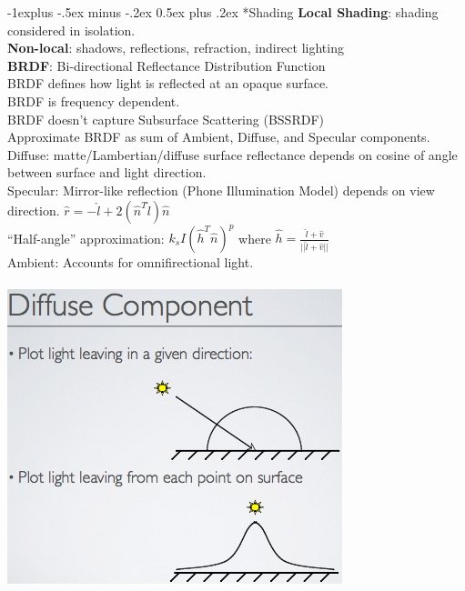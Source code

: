 \documentclass[3pt,landscape]{article}
\makeatletter
\renewcommand{\subsection}{\@startsection{subsection}{2}{0mm}%
                            {-1explus -.5ex minus -.2ex}%
                            {0.5ex plus .2ex}%
                            {\normalfont\normalsize\bfseries}}
\makeatother
\begin{document}
\begin{multicols}{3}
\subsection*{Shading}
{\bf Local Shading}: shading considered in isolation.\\
{\bf Non-local}: shadows, reflections, refraction, indirect lighting\\
{\bf BRDF}: Bi-directional Reflectance Distribution Function\\
BRDF defines how light is reflected at an opaque surface.\\
BRDF is frequency dependent.\\
BRDF doesn't capture Subsurface Scattering (BSSRDF)\\
Approximate BRDF as sum of Ambient, Diffuse, and Specular components.\\
Diffuse: matte/Lambertian/diffuse surface reflectance depends on cosine of angle between surface and light direction.\\
Specular: Mirror-like reflection (Phone Illumination Model) depends on view direction. \(\hat{r}=-\hat{l}+2(\hat{n}^T\hat{l})\hat{n}\)\\
``Half-angle'' approximation: \(k_sI(\hat{h}^T\hat{n})^p\) where \(\hat{h}=\frac{\hat{l}+\hat{v}}{||\hat{l}+\hat{v}||}\)\\
Ambient: Accounts for omnifirectional light.\\
\\
\includegraphics[scale=0.32]{images/diffuse}

\end{multicols}
\end{document}

